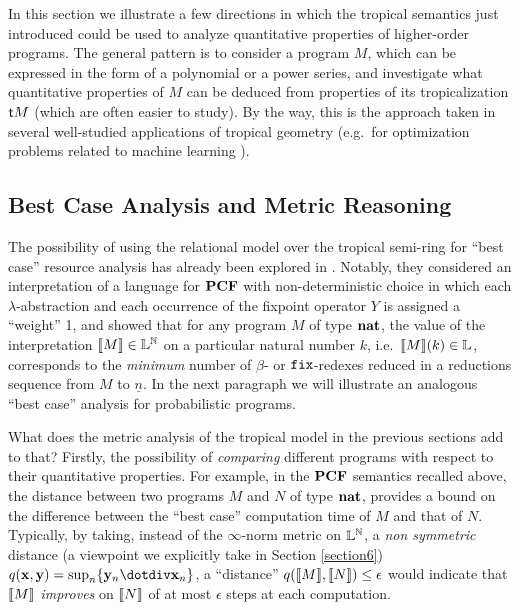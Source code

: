

In this section we illustrate a few directions in which the tropical semantics just introduced could be used to analyze quantitative properties of higher-order programs. 
The general pattern is to consider a program $M$, which can be expressed in the form of a polynomial or a power series, and 
investigate what quantitative properties of $M$ can be deduced from properties of its tropicalization $\mathsf{t} M$ (which are often easier to study).
By the way, this is the approach taken in several well-studied applications of tropical geometry (e.g.~for optimization problems related to machine learning \cite{}).



\subsection{Best Case Analysis and Metric Reasoning}

The possibility of using the relational model over the tropical semi-ring for ``best case'' resource analysis has already been explored in \cite{Manzo}. Notably, they considered an interpretation of a language for $\mathbf{PCF}$ with non-deterministic choice in which each $\lambda$-abstraction and each occurrence of the fixpoint operator $Y$ is assigned a ``weight'' 1, and showed that for any program $M$ of type $\mathbf{nat}$, 
the value of the interpretation $\llbracket M\rrbracket\in \mathbb{L}^{\mathbb{N}}$ on a particular natural number $k$, i.e.~$\llbracket M\rrbracket(k)\in \mathbb{L}$, corresponds to the \emph{minimum} number of $\beta$- or $\mathtt{fix}$-redexes reduced in a reductions sequence from $M$ to $\underline n$. 
In the next paragraph we will illustrate an analogous ``best case'' analysis for probabilistic programs.

What does the metric analysis of the tropical model in the previous sections add to that? Firstly, the possibility of \emph{comparing} different programs with respect to their quantitative properties. For example, in the $\mathbf{PCF}$ semantics recalled above, the distance between two programs $M$ and $N$ of type $\mathbf{nat}$, provides a bound on the difference between the  ``best case'' computation time of $M$ and that of $N$. Typically, by taking, instead of the $\infty$-norm metric on $\mathbb{L}^{\mathbb{N}}$,  
a \emph{non symmetric} distance (a viewpoint we explicitly take in Section \ref{section6}) $q(\B x, \B y)=\sup_{n}\{\B y_{n}\dotdiv \B x_{n}\}$, a ``distance'' $q(\llbracket M\rrbracket,\llbracket N\rrbracket)\leq \epsilon$ would indicate that $\llbracket M\rrbracket$ \emph{improves} on $\llbracket N\rrbracket$ of at most $\epsilon$ steps at each computation. 

